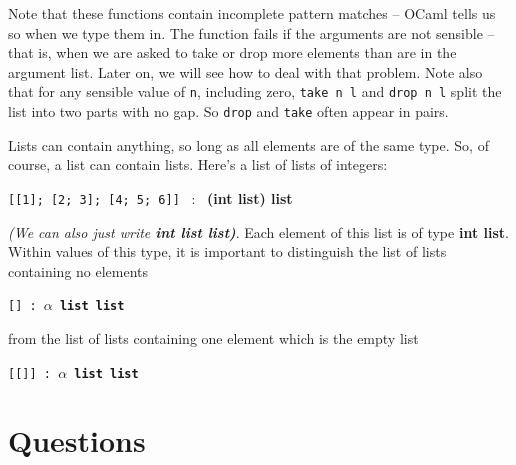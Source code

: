\documentclass[]{book}
\newcommand{\smspace}{\vspace{4mm}}
\begin{document}
\noindent Note that these functions contain incomplete pattern matches -- OCaml tells us so when we type them in. The function fails if the arguments are not sensible -- that is, when we are asked to take or drop more elements than are in the argument list. Later on, we will see how to deal with that problem. Note also that for any sensible value of \texttt{n}, including zero, \texttt{take\! n\! l} and \texttt{drop\! n\! l} split the list into two parts with no gap. So \texttt{drop} and \texttt{take} often appear in pairs.

Lists can contain anything, so long as all elements are of the same type. So, of course, a list can contain lists. Here's a list of lists of integers:

\smspace
\texttt{[[1]; [2; 3]; [4; 5; 6]]} \ : \ \textrm{\textbf{\textmd{(}int list\textmd{)} list}}\smspace

\noindent \textit{(We can also just write \textbf{\textrm{\textup{int list list})}}}. Each element of this list is of type \textrm{\textbf{int list}}. Within values of this type, it is important to distinguish the list of lists containing no elements

\smspace
\texttt{[] :\ \textrm{\textbf{$\alpha$ list list}}}
\smspace

\noindent from the list of lists containing one element which is the empty list

\smspace
\texttt{[[]] :\ \textrm{\textbf{$\alpha$ list list}}}
\smspace


\clearpage
\section*{Questions}
\end{document}
